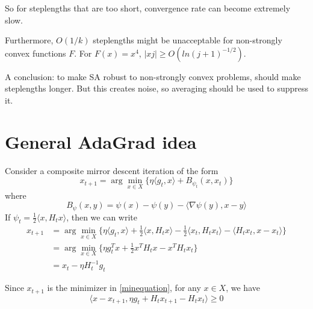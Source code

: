 \documentclass{article}
\begin{document}
So for steplengths that are too short, convergence rate can become extremely slow.

Furthermore, $O(1/k)$ steplengths might be unacceptable for non-strongly convex functions $F$. For $F(x)= x^4$, $|x{j}| \geq O(ln(j+1)^{-1/2})$.

A conclusion: to make SA robust to non-strongly convex problems, should make steplengths longer. But this creates noise, so averaging should be used to suppress it. 

\newpage
 
\section*{General AdaGrad idea}
Consider a composite mirror descent iteration of the form
\begin{equation}
x_{t+1} = \arg \min_{x \in X} \{ \eta \langle g_t,x \rangle + B_{\psi_t} (x,x_t)\}
\end{equation}
where
\begin{equation}
B_{\psi} (x,y) = \psi(x) - \psi(y)  - \langle \nabla \psi(y), x - y \rangle
\end{equation}
If $\psi_t = \frac{1}{2} \langle x, H_t x \rangle$, then we can write
\begin{align}
x_{t+1} &= \arg \min_{x \in X} \{ \eta \langle g_t,x \rangle + \frac{1}{2} \langle x, H_t x \rangle - \frac{1}{2} \langle x_t, H_t x_t \rangle  - \langle H_t x_t , x -x_t \rangle \} \\ 
\label{minequation}
&= \arg \min_{x \in X} \{ \eta g_t^T x  +  \frac{1}{2}  x^T H_t x    - x^T H_t x_t\} \\
&=x_t - \eta H^{-1}_t g_t
\end{align}

Since $x_{t+1}$ is the minimizer in \eqref{minequation}, for any $x \in X$, we have
\begin{equation}
\langle x - x_{t+1} , \eta g_t + H_t x_{t+1} - H_t x_t \rangle \geq 0
\end{equation}
\end{document}
